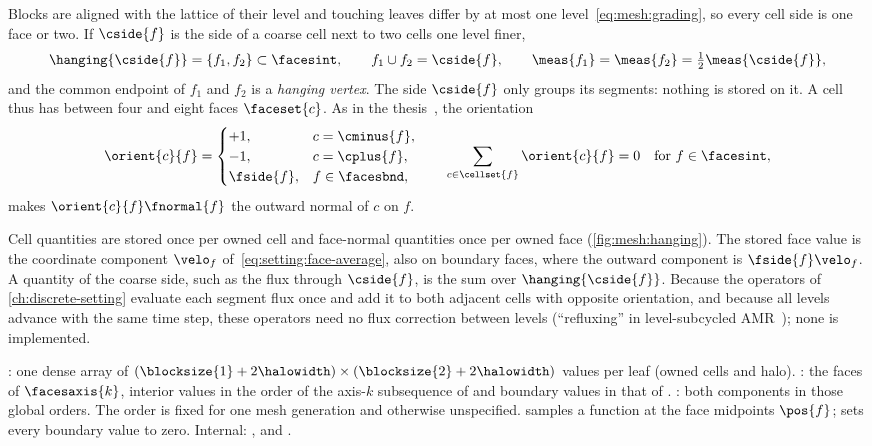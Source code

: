 Blocks are aligned with the lattice of their level and touching leaves differ
by at most one level~\cref{eq:mesh:grading}, so every cell side is one face or
two. If $\cside{f}$ is the side of a coarse cell next to two cells one level
finer,
\begin{equation}\label{eq:mesh:hanging}
  \hanging{\cside{f}}=\{f_1,f_2\}\subset\facesint,\qquad
  f_1\cup f_2=\cside{f},\qquad \meas{f_1}=\meas{f_2}=\tfrac12\meas{\cside{f}},
\end{equation}
and the common endpoint of $f_1$ and $f_2$ is a \emph{hanging vertex}. The
side $\cside{f}$ only groups its segments: nothing is stored on it. A cell
thus has between four and eight faces $\faceset{c}$. As in
the thesis~, the orientation
\begin{equation}\label{eq:mesh:orientation}
  \orient{c}{f}=\begin{cases}+1, & c=\cminus{f},\\ -1, & c=\cplus{f},\\
    \fside{f}, & f\in\facesbnd,\end{cases}
  \qquad
  \sum_{c\in\cellset{f}}\orient{c}{f}=0\quad\text{for }f\in\facesint,
\end{equation}
makes $\orient{c}{f}\fnormal{f}$ the outward normal of $c$ on $f$.

Cell quantities are stored once per owned cell and face-normal quantities
once per owned face (\cref{fig:mesh:hanging}). The stored face value is the
coordinate component $\velo_f$ of~\cref{eq:setting:face-average}, also on
boundary faces, where the outward component is $\fside{f}\velo_f$. A quantity
of the coarse side, such as the flux through $\cside{f}$, is the sum over
$\hanging{\cside{f}}$. Because the operators of \cref{ch:discrete-setting}
evaluate each segment flux once and add it to both adjacent cells with
opposite orientation, and because all levels advance with the same time step,
these operators need no flux correction between levels (``refluxing'' in
level-subcycled AMR~\cite{berger1989}); none is implemented.



\begin{implnote}
: one dense array of
$(\blocksize{1}+2\halowidth)\times(\blocksize{2}+2\halowidth)$ values per leaf
(owned cells and halo). : the faces of
$\facesaxis{k}$, interior values in the order of the axis-$k$ subsequence of
 and boundary values in that of .
: both components in those global orders. The order is
fixed for one mesh generation and otherwise unspecified. 
samples a function at the face midpoints $\pos{f}$;
 sets every boundary value to zero.
Internal: ,
 and
.
\end{implnote}


